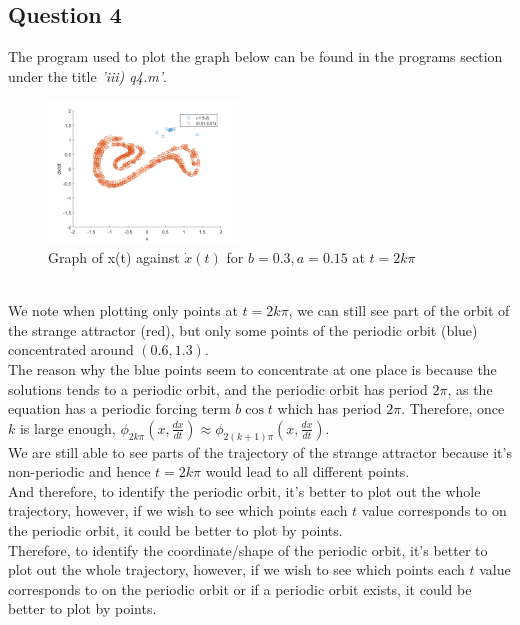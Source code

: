\documentclass[10pt]{article}
\begin{document}
\subsection*{Question 4}
The program used to plot the graph below can be found in the programs section under the title \emph{'iii) q4.m'}.
\begin{figure}[ht]
\centering
\includegraphics[width=0.45\textwidth]{Files/q4.png}
\caption{Graph of x(t) against $\dot{x}(t)$ for $b=0.3, a=0.15$ at $t=2k\pi$}
\end{figure}\\
We note when plotting only points at $t=2k\pi$, we can still see part of the orbit of the strange attractor (red), but only some points of the periodic orbit (blue) concentrated around $(0.6,1.3)$.\\
The reason why the blue points seem to concentrate at one place is because the solutions tends to a periodic orbit, and the periodic orbit has period $2\pi$, as the equation has a periodic forcing term $b\cos t$ which has period $2\pi$. Therefore, once $k$ is large enough, $\phi_{2k\pi}(x,\frac{dx}{dt})\approx\phi_{2(k+1)\pi}(x,\frac{dx}{dt})$.\\
We are still able to see parts of the trajectory of the strange attractor because it's non-periodic and hence $t=2k\pi$ would lead to all different points.\\
And therefore, to identify the periodic orbit, it's better to plot out the whole trajectory, however, if we wish to see which points each $t$ value corresponds to on the periodic orbit, it could be better to plot by points.\\
Therefore, to identify the coordinate/shape of the periodic orbit, it's better to plot out the whole trajectory, however, if we wish to see which points each $t$ value corresponds to on the periodic orbit or if a periodic orbit exists, it could be better to plot by points.
\end{document}
